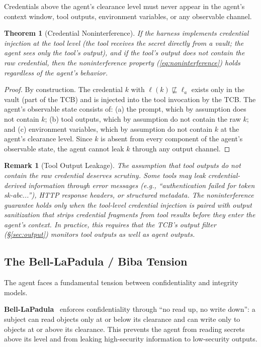 \documentclass[11pt, a4paper, copyright]{googledeepmind}
\newtheorem{theorem}{Theorem}[section]
\newtheorem*{remark}{Remark}
\begin{document}
Credentials above the agent's clearance level must never appear in the agent's context window, tool outputs, environment variables, or any observable channel.

\begin{theorem}[Credential Noninterference]
\label{thm:noninterference}
If the harness implements credential injection at the tool level (the tool receives the secret directly from a vault; the agent sees only the tool's output), and if the tool's output does not contain the raw credential, then the noninterference property (\ref{eq:noninterference}) holds regardless of the agent's behavior.
\end{theorem}

\begin{proof}
By construction. The credential $k$ with $\ell(k) \not\sqsubseteq \ell_a$ exists only in the vault (part of the TCB) and is injected into the tool invocation by the TCB. The agent's observable state consists of: (a) the prompt, which by assumption does not contain $k$; (b) tool outputs, which by assumption do not contain the raw $k$; and (c) environment variables, which by assumption do not contain $k$ at the agent's clearance level. Since $k$ is absent from every component of the agent's observable state, the agent cannot leak $k$ through any output channel.
\end{proof}

\begin{remark}[Tool Output Leakage]
The assumption that tool outputs do not contain the raw credential deserves scrutiny. Some tools may leak credential-derived information through error messages (e.g., ``authentication failed for token sk-abc...''), HTTP response headers, or structured metadata. The noninterference guarantee holds only when the tool-level credential injection is paired with output sanitization that strips credential fragments from tool results before they enter the agent's context. In practice, this requires that the TCB's output filter (\S\ref{sec:output}) monitors tool outputs as well as agent outputs.
\end{remark}

\subsection{The Bell-LaPadula / Biba Tension}

The agent faces a fundamental tension between confidentiality and integrity models.

\textbf{Bell-LaPadula}~\citep{bell1973secure} enforces confidentiality through ``no read up, no write down'': a subject can read objects only at or below its clearance and can write only to objects at or above its clearance. This prevents the agent from reading secrets above its level and from leaking high-security information to low-security outputs.
\end{document}
